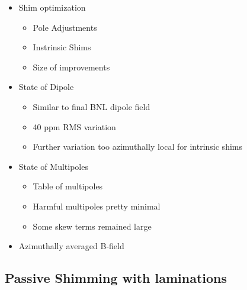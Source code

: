 \begin{itemize}
  \item Shim optimization
    \begin{itemize}
        \item Pole Adjustments
        \item Instrinsic Shims
        \item Size of improvements
    \end{itemize}
  \item State of Dipole
    \begin{itemize}
      \item Similar to final BNL dipole field
      \item 40 ppm RMS variation
      \item Further variation too azimuthally local for intrinsic shims
    \end{itemize}
  \item State of Multipoles
    \begin{itemize}
      \item Table of multipoles
      \item Harmful multipoles pretty minimal
      \item Some skew terms remained large
    \end{itemize}
  \item Azimuthally averaged B-field    
\end{itemize}

\subsection{Passive Shimming with laminations}

